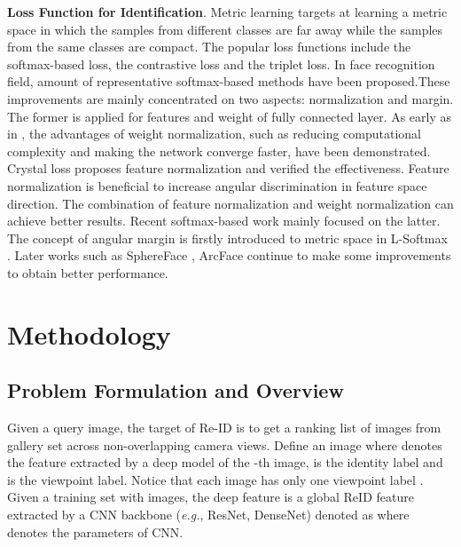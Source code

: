 \documentclass[letterpaper]{article} \usepackage{aaai20}  \usepackage{times}  \usepackage{helvet} \usepackage{courier}  \usepackage[hyphens]{url}  \usepackage{graphicx} \usepackage{array}
\begin{document}
\noindent \textbf{Loss Function for Identification}. 
Metric learning targets at learning a metric space in which the samples from different classes are far away while the samples from the same classes are compact. The popular loss functions include the softmax-based loss, the contrastive loss and the triplet loss.
In face recognition field, amount of representative softmax-based methods \cite{Salimans2016WeightNA,Liu2017SphereFaceDH,Ranjan2018CrystalLA,Deng_2019_CVPR} have been proposed.These improvements are mainly concentrated on two aspects: normalization and margin. The former is applied for features and weight of fully connected layer. As early as in \cite{Salimans2016WeightNA}, the advantages of weight normalization, such as reducing computational complexity and making the network converge faster, have been demonstrated. Crystal loss \cite{Ranjan2018CrystalLA} proposes feature normalization and verified the effectiveness. Feature normalization is beneficial to increase angular discrimination in feature space direction. The combination of feature normalization and weight normalization can achieve better results. Recent softmax-based work mainly focused on the latter. The concept of angular margin is firstly introduced to metric space in L-Softmax \cite{Liu2016LargeMarginSL}. Later works such as SphereFace \cite{Liu2017SphereFaceDH}, ArcFace \cite{Deng_2019_CVPR} continue to make some improvements to obtain better performance.



\section{Methodology}
\subsection{Problem Formulation and Overview}
Given a query image, the target of Re-ID is to get a ranking list of images from gallery set across non-overlapping camera views. Define an image   where  denotes the feature extracted by a deep model of the -th image,  is the identity label and  is the viewpoint label. Notice that each image  has only one viewpoint label . Given a training set  with  images, the deep feature  is a global ReID feature extracted by a CNN backbone (\textit{e.g.}, ResNet, DenseNet) denoted as  where  denotes the parameters of CNN. 
\end{document}

